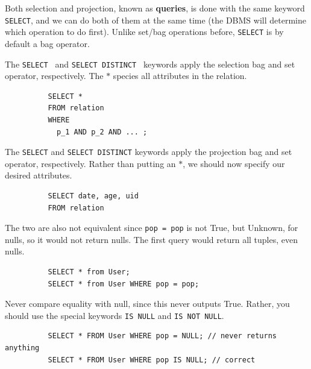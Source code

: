 \documentclass{article}
\begin{document}
      Both selection and projection, known as \textbf{queries}, is done with the same keyword \texttt{SELECT}, and we can do both of them at the same time (the DBMS will determine which operation to do first). Unlike set/bag operations before, \texttt{SELECT} is by default a bag operator. 

      \begin{definition}[Selection]
        The \texttt{SELECT \*} and \texttt{SELECT DISTINCT \*} keywords apply the selection bag and set operator, respectively. The $\ast$ species all attributes in the relation. 
        \begin{lstlisting}
          SELECT * 
          FROM relation 
          WHERE 
            p_1 AND p_2 AND ... ; 
        \end{lstlisting}
      \end{definition} 

      \begin{definition}[Projection]
        The \texttt{SELECT} and \texttt{SELECT DISTINCT} keywords apply the projection bag and set operator, respectively. Rather than putting an $\ast$, we should now specify our desired attributes. 
        \begin{lstlisting}
          SELECT date, age, uid
          FROM relation 
        \end{lstlisting}
      \end{definition} 

      \begin{example}
        The two are also not equivalent since \texttt{pop = pop} is not True, but Unknown, for nulls, so it would not return nulls. The first query would return all tuples, even nulls. 
        \begin{lstlisting}
          SELECT * from User; 
          SELECT * from User WHERE pop = pop; 
        \end{lstlisting}
      \end{example}

      \begin{example}
        Never compare equality with null, since this never outputs True. Rather, you should use the special keywords \texttt{IS NULL} and \texttt{IS NOT NULL}. 
        \begin{lstlisting}
          SELECT * FROM User WHERE pop = NULL; // never returns anything 
          SELECT * FROM User WHERE pop IS NULL; // correct 
        \end{lstlisting}
      \end{example}
\end{document}
